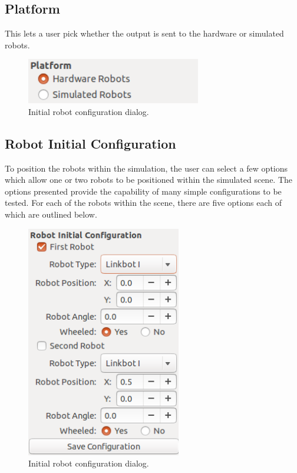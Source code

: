 \documentclass{article}
\begin{document}
\subsection{Platform}
This lets a user pick whether the output is sent to the hardware or simulated robots.
\begin{figure}[H]
	\begin{center}
		\includegraphics[width=3in]{images/platform}
	\end{center}
	\caption{Initial robot configuration dialog.}
	\label{fig:platform}
\end{figure}

\subsection{Robot Initial Configuration}
To position the robots within the simulation, the user can select a few options which allow
one or two robots to be positioned within the simulated scene.  The options presented provide
the capability of many simple configurations to be tested.  For each of the robots within the scene,
there are five options each of which are outlined below.
\begin{figure}[H]
	\begin{center}
		\includegraphics[height=4in]{images/configuration}
	\end{center}
	\caption{Initial robot configuration dialog.}
	\label{fig:config}
\end{figure}
\end{document}
